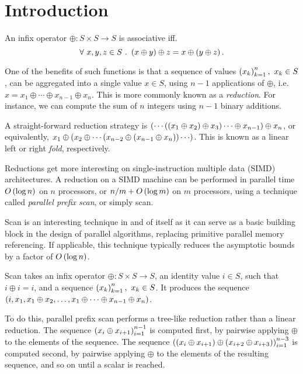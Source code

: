 \section{Introduction}

An infix operator $\oplus:S\times S\rightarrow S$ is associative iff.
\[\forall\ x,y,z\in S\ .\ \p{x \oplus y} \oplus z = x \oplus \p{y \oplus z}.\]

One of the benefits of such functions is that a sequence of values
$\left({x_k}\right)_{k=1}^n,\ x_k\in S$, can be aggregated into a single value $x\in S$,
using $n-1$ applications of $\oplus$, i.e. $x = x_1 \oplus \cdots \oplus
x_{n-1} \oplus x_n$. This is more commonly known as a \emph{reduction}.  For
instance, we can compute the sum of $n$ integers using $n-1$ binary additions.

A straight-forward reduction strategy is $\left({\cdots \left({\left({x_1 \oplus x_2}\right)
\oplus x_3}\right) \cdots \oplus x_{n-1}}\right) \oplus x_n$, or equivalently, $x_1 \oplus
\left({x_2 \oplus \cdots \left({x_{n-2} \oplus \left({x_{n-1} \oplus x_n}\right)}\right) \cdots }\right)$.  This
is known as a linear left or right \emph{fold}, respectively.

Reductions get more interesting on single-instruction multiple data (SIMD)
architectures. A reduction on a SIMD machine can be performed in parallel time
$O\left({\log n}\right)$ on $n$ processors, or ${n/m}+O\left({\log m}\right)$ on $m$ processors,
using a technique called \emph{parallel prefix scan}, or simply scan.

Scan is an interesting technique in and of itself as it can serve as a basic
building block in the design of parallel algorithms, replacing primitive
parallel memory referencing. If applicable, this technique typically reduces
the asymptotic bounds by a factor of $O\left({\log n}\right)$\cite{blelloch}.

Scan takes an infix operator $\oplus:S\times S\rightarrow S$, an identity value
$i\in S$, such that $i\oplus i = i$, and a sequence $\left({x_k}\right)_{k=1}^n,\ x_k\in
S$.  It produces the sequence $\left({i, x_1, x_1 \oplus x_2, \ldots, x_1 \oplus
\cdots \oplus x_{n-1} \oplus x_n}\right)$.

To do this, parallel prefix scan performs a tree-like reduction rather than a
linear reduction. The sequence $\left({x_i \oplus x_{i+1}}\right)_{i=1}^{n-1}$ is computed
first, by pairwise applying $\oplus$ to the elements of the sequence. The
sequence $\left({\left({x_i \oplus x_{i+1}}\right) \oplus \left({x_{i+2} \oplus
x_{i+3}}\right)}\right)_{i=1}^{n-3}$ is computed second, by pairwise applying $\oplus$ to the
elements of the resulting sequence, and so on until a scalar is reached.

